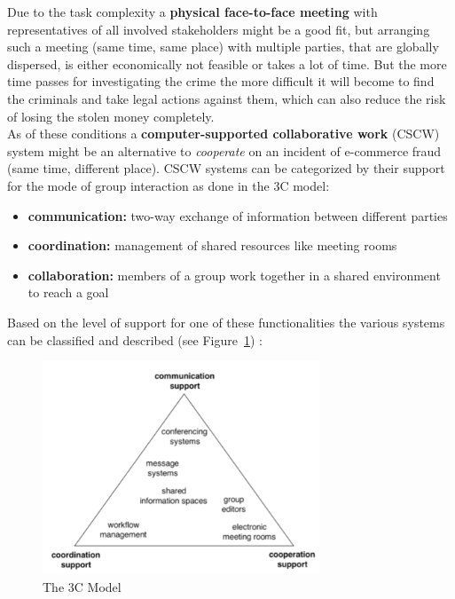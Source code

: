 Due to the task complexity a \textbf{physical face-to-face meeting} with representatives of all involved stakeholders might be a good fit, but arranging such a meeting (same time, same place) with multiple parties,
that are globally dispersed, is either economically not feasible or takes a lot of time. But the more time passes for investigating the crime the more difficult it will become to find the criminals and take legal actions against them,
which can also reduce the risk of losing the stolen money completely. \\

As of these conditions a \textbf{computer-supported collaborative work} (CSCW) system might be an alternative to \textit{cooperate} on an incident of e-commerce fraud (same time, different place).
CSCW systems can be categorized by their support for the mode of group interaction as done in the 3C model:

\begin{itemize}
    \item\textbf{communication:} two-way exchange of information between different parties
    \item\textbf{coordination:} management of shared resources like meeting rooms
    \item\textbf{collaboration:} members of a group work together in a shared environment to reach a goal
\end{itemize}

Based on the level of support for one of these functionalities the various systems can be classified and described (see Figure~\ref{fig:images_3C_model}) \citep{Koch2008}:

\begin{figure}[H]
	\centering
		\includegraphics[height=2.5in]{images/3C-model.png}
	\caption{The 3C Model \citep{Koch2008}}
\label{fig:images_3C_model}
\end{figure}

